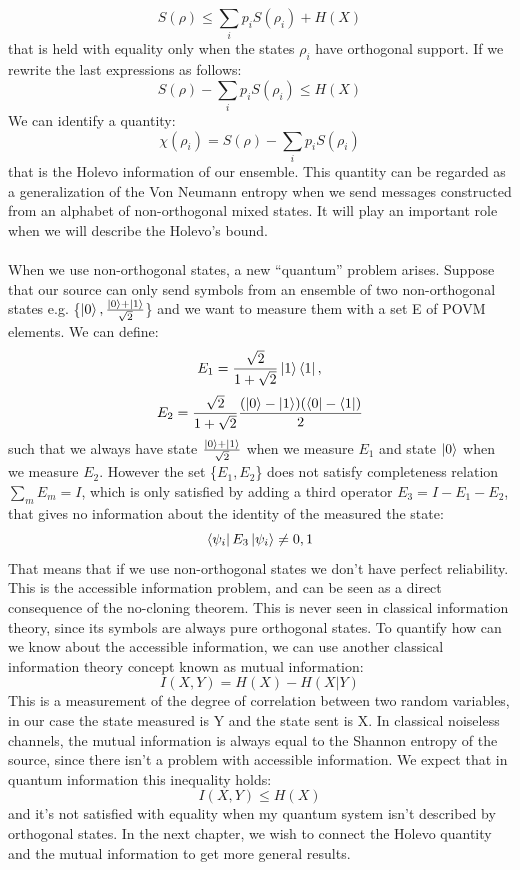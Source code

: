 \documentclass[journal, letterpaper]{IEEEtran}
\begin{document}
\[S(\rho) \le \sum_{i}p_iS(\rho_i) + H(X)\] that is held with equality only when the states $\rho_i$ have orthogonal support. If we rewrite the last expressions as follows: 
\[S(\rho) - \sum_{i}p_iS(\rho_i) \le  H(X)\]
We can identify a quantity: \[\chi(\rho_i) = S(\rho) - \sum_{i}p_iS(\rho_i)\] that is the Holevo information of our ensemble. This quantity can be regarded as a generalization of the Von Neumann entropy when we send messages constructed from an alphabet of non-orthogonal mixed states. It will play an important role when we will describe the Holevo's bound.
\\
\\
When we use non-orthogonal states, a new “quantum” problem arises. Suppose that our source can only send symbols from an ensemble of two non-orthogonal states e.g. \{$\ket{0}, \frac{\ket{0}+\ket{1}}{\sqrt{2}}$\} and we want to measure them with a set {E} of POVM elements. We can define: \[E_1 = \frac{\sqrt{2}}{1+\sqrt{2}}\ket{1}\bra{1},\] \[E_2 = \frac{\sqrt{2}}{1+\sqrt{2}}\frac{(\ket{0}-\ket{1})(\bra{0}-\bra{1})}{2}\] such that we always have state $\frac{\ket{0}+\ket{1}}{\sqrt{2}}$ when we measure $E_1$ and state $\ket{0}$ when we measure $E_2$. However the set \{$E_1,E_2$\} does not satisfy completeness relation $\sum_mE_m = I$, which is only satisfied by adding a third operator $E_3 = I- E_1-E_2$, that gives no information about the identity of the measured the state: \[\bra{\psi_i}E_3\ket{\psi_i} \neq 0,1 \] That means that if we use non-orthogonal states we don't have perfect reliability. This is the accessible information problem, and can be seen as a direct consequence of the no-cloning theorem. This is never seen in classical information theory, since its symbols are always pure orthogonal states. To quantify how can we know about the accessible information, we can use another classical information theory concept known as mutual information: 
\[I(X,Y) = H(X) - H(X|Y)\]
This is a measurement of the degree of correlation between two random variables, in our case the state measured is Y and the state sent is X. In classical noiseless channels, the mutual information is always equal to the Shannon entropy of the source, since there isn't a problem with accessible information. We expect that in quantum information this inequality holds: \[I(X,Y) \le H(X)\]and it's not satisfied with equality when my quantum system isn't described by orthogonal states. In the next chapter, we wish to connect the Holevo quantity and the mutual information to get more general results.  
\end{document}
